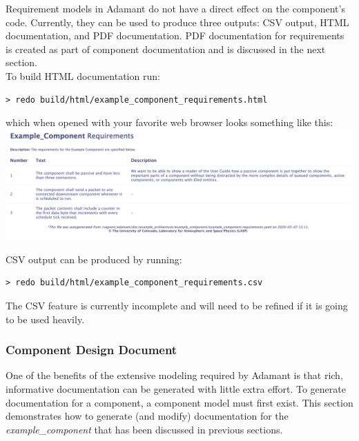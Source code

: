 Requirement models in Adamant do not have a direct effect on the component's code. Currently, they can be used to produce three outputs: CSV output, HTML documentation, and PDF documentation. PDF documentation for requirements is created as part of component documentation and is discussed in the next section. \\

To build HTML documentation run:

\vspace{5mm} %
\begin{verbatim}
> redo build/html/example_component_requirements.html
\end{verbatim}
\vspace{5mm} %

which when opened with your favorite web browser looks something like this: \\

\vspace{5mm} %
\includegraphics[width=\textwidth]{images/requirementshtml.png}
\vspace{5mm} %

CSV output can be produced by running:

\vspace{5mm} %
\begin{verbatim}
> redo build/html/example_component_requirements.csv
\end{verbatim}
\vspace{5mm} %

The CSV feature is currently incomplete and will need to be refined if it is going to be used heavily.

\subsubsection{Component Design Document} \label{Component Design Document}

One of the benefits of the extensive modeling required by Adamant is that rich, informative documentation can be generated with little extra effort. To generate documentation for a component, a component model must first exist. This section demonstrates how to generate (and modify) documentation for the \textit{example\_component} that has been discussed in previous sections. \\

